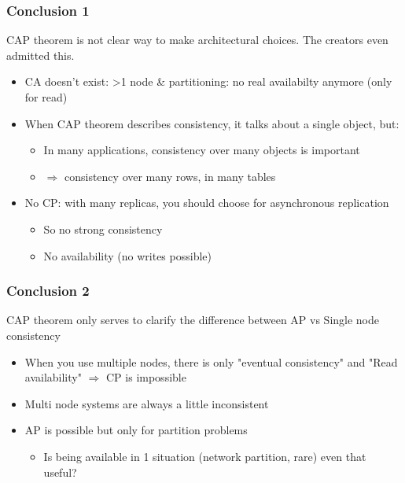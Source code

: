 \documentclass{article}
\begin{document}
\subsubsection{Conclusion 1}

CAP theorem is not clear way to make architectural choices. The creators even admitted this.

\begin{itemize}
    \item CA doesn't exist: >1 node \& partitioning: no real availabilty anymore (only for read)
    \item When CAP theorem describes consistency, it talks about a single object, but: 
    \begin{itemize}
        \item In many applications, consistency over many objects is important
        \item $\Rightarrow$ consistency over many rows, in many tables
    \end{itemize} 
    \item No CP: with many replicas, you should choose for asynchronous replication
    \begin{itemize}
        \item So no strong consistency
        \item No availability (no writes possible)
    \end{itemize}
\end{itemize}

\subsubsection{Conclusion 2}

CAP theorem only serves to clarify the difference between AP vs Single node consistency

\begin{itemize}
    \item When you use multiple nodes, there is only "eventual consistency" and "Read availability" $\Rightarrow$ CP is impossible
    \item Multi node systems are always a little inconsistent
    \item AP is possible but only for partition problems
    \begin{itemize}
        \item Is being available in 1 situation (network partition, rare) even that useful?
    \end{itemize}
\end{itemize}
\end{document}
